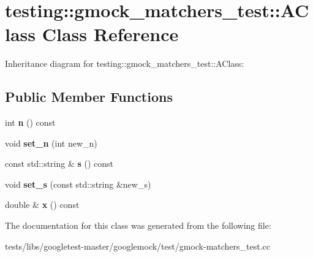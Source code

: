 \hypertarget{classtesting_1_1gmock__matchers__test_1_1AClass}{}\section{testing\+:\+:gmock\+\_\+matchers\+\_\+test\+:\+:A\+Class Class Reference}
\label{classtesting_1_1gmock__matchers__test_1_1AClass}


Inheritance diagram for testing\+:\+:gmock\+\_\+matchers\+\_\+test\+:\+:A\+Class\+:
\subsection*{Public Member Functions}
\begin{DoxyCompactItemize}
\item 
\mbox{\label{classtesting_1_1gmock__matchers__test_1_1AClass_add84ab9ef4a6bbe78719a9528bf6fb90}} 
int {\bfseries n} () const
\item 
\mbox{\label{classtesting_1_1gmock__matchers__test_1_1AClass_a3181466cec6faa5ab3c6bc5c4dbf67b2}} 
void {\bfseries set\+\_\+n} (int new\+\_\+n)
\item 
\mbox{\label{classtesting_1_1gmock__matchers__test_1_1AClass_a1645862d2061ccf04b67761314c7bb97}} 
const std\+::string \& {\bfseries s} () const
\item 
\mbox{\label{classtesting_1_1gmock__matchers__test_1_1AClass_a9e2ea4f630928618137cfaadb6298fcf}} 
void {\bfseries set\+\_\+s} (const std\+::string \&new\+\_\+s)
\item 
\mbox{\label{classtesting_1_1gmock__matchers__test_1_1AClass_ade61d438cb535d71d0dcc17a1d5bd7cd}} 
double \& {\bfseries x} () const
\end{DoxyCompactItemize}


The documentation for this class was generated from the following file\+:\begin{DoxyCompactItemize}
\item 
tests/libs/googletest-\/master/googlemock/test/gmock-\/matchers\+\_\+test.\+cc\end{DoxyCompactItemize}

